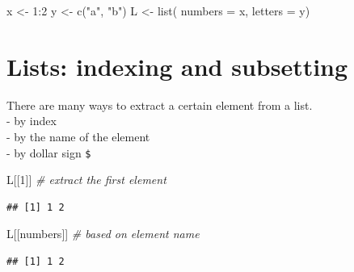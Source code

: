 \documentclass[
  11pt,
]{book}
\newenvironment{Shaded}{\begin{snugshade}}{\end{snugshade}}
\newcommand{\AttributeTok}[1]{\textcolor[rgb]{0.77,0.63,0.00}{#1}}
\newcommand{\CommentTok}[1]{\textcolor[rgb]{0.56,0.35,0.01}{\textit{#1}}}
\newcommand{\DecValTok}[1]{\textcolor[rgb]{0.00,0.00,0.81}{#1}}
\newcommand{\FunctionTok}[1]{\textcolor[rgb]{0.00,0.00,0.00}{#1}}
\newcommand{\NormalTok}[1]{#1}
\newcommand{\OtherTok}[1]{\textcolor[rgb]{0.56,0.35,0.01}{#1}}
\newcommand{\SpecialCharTok}[1]{\textcolor[rgb]{0.00,0.00,0.00}{#1}}
\newcommand{\StringTok}[1]{\textcolor[rgb]{0.31,0.60,0.02}{#1}}
\begin{document}
\begin{Shaded}
\begin{Highlighting}[]
\NormalTok{x }\OtherTok{\textless{}{-}} \DecValTok{1}\SpecialCharTok{:}\DecValTok{2}
\NormalTok{y }\OtherTok{\textless{}{-}} \FunctionTok{c}\NormalTok{(}\StringTok{"a"}\NormalTok{, }\StringTok{"b"}\NormalTok{)}
\NormalTok{L }\OtherTok{\textless{}{-}} \FunctionTok{list}\NormalTok{( }\AttributeTok{numbers =}\NormalTok{ x, }\AttributeTok{letters =}\NormalTok{ y)}
\end{Highlighting}
\end{Shaded}

\hypertarget{lists-indexing-and-subsetting}{%
\section{Lists: indexing and subsetting}\label{lists-indexing-and-subsetting}}

There are many ways to extract a certain element from a list.\\
- by index\\
- by the name of the element\\
- by dollar sign \texttt{\$}

\begin{Shaded}
\begin{Highlighting}[]
\NormalTok{L[[}\DecValTok{1}\NormalTok{]] }\CommentTok{\# extract the first element}
\end{Highlighting}
\end{Shaded}

\begin{verbatim}
## [1] 1 2
\end{verbatim}

\begin{Shaded}
\begin{Highlighting}[]
\NormalTok{L[[}\StringTok{\textquotesingle{}numbers\textquotesingle{}}\NormalTok{]] }\CommentTok{\# based on element name}
\end{Highlighting}
\end{Shaded}

\begin{verbatim}
## [1] 1 2
\end{verbatim}

\begin{Shaded}
\end{Shaded}
\end{document}
